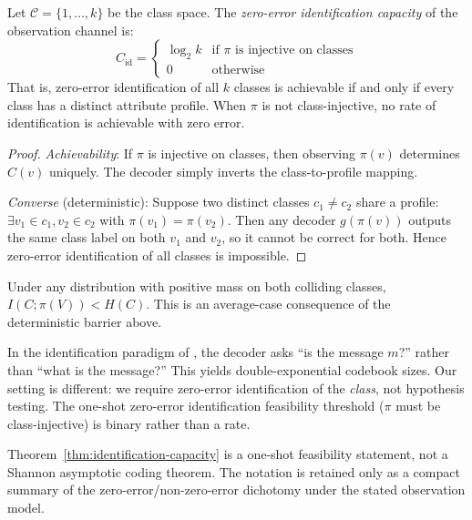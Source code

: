 \begin{theorem}\label{thm:identification-capacity}
Let $\mathcal{C} = \{1, \ldots, k\}$ be the class space. The \emph{zero-error identification capacity} of the observation channel is:
\[
C_{\text{id}} = \begin{cases}
\log_2 k & \text{if } \pi \text{ is injective on classes} \\
0 & \text{otherwise}
\end{cases}
\]
That is, zero-error identification of all $k$ classes is achievable if and only if every class has a distinct attribute profile. When $\pi$ is not class-injective, no rate of identification is achievable with zero error.
\end{theorem}

\begin{proof}
\emph{Achievability}: If $\pi$ is injective on classes, then observing $\pi(v)$ determines $C(v)$ uniquely. The decoder simply inverts the class-to-profile mapping.

\emph{Converse} (deterministic): Suppose two distinct classes $c_1 \neq c_2$ share a profile: $\exists v_1 \in c_1, v_2 \in c_2$ with $\pi(v_1) = \pi(v_2)$. Then any decoder $g(\pi(v))$ outputs the same class label on both $v_1$ and $v_2$, so it cannot be correct for both. Hence zero-error identification of all classes is impossible.
\end{proof}

\begin{remark}
Under any distribution with positive mass on both colliding classes, $I(C; \pi(V)) < H(C)$. This is an average-case consequence of the deterministic barrier above.
\end{remark}

\begin{remark}
In the identification paradigm of \cite{ahlswede1989identification}, the decoder asks ``is the message $m$?'' rather than ``what is the message?'' This yields double-exponential codebook sizes. Our setting is different: we require zero-error identification of the \emph{class}, not hypothesis testing. The one-shot zero-error identification feasibility threshold ($\pi$ must be class-injective) is binary rather than a rate.
\end{remark}

\begin{remark}[Terminology]
Theorem~\ref{thm:identification-capacity} is a one-shot feasibility statement, not a Shannon asymptotic coding theorem. The notation is retained only as a compact summary of the zero-error/non-zero-error dichotomy under the stated observation model.
\end{remark}

